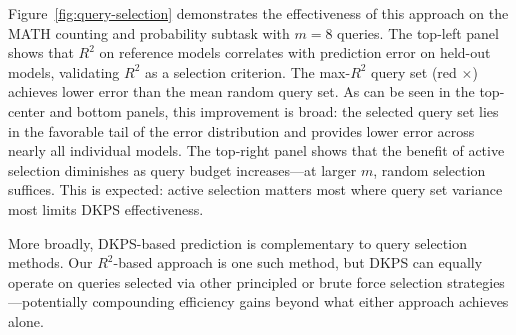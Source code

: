 Figure~\ref{fig:query-selection} demonstrates the effectiveness of this approach on the MATH counting and probability subtask with $m = 8$ queries.
The top-left panel shows that $R^2$ on reference models correlates with prediction error on held-out models, validating $R^2$ as a selection criterion.
The max-$R^2$ query set (red $\times$) achieves lower error than the mean random query set.
As can be seen in the top-center and bottom panels, this improvement is broad: the selected query set lies in the favorable tail of the error distribution and provides lower error across nearly all individual models.
The top-right panel shows that the benefit of active selection diminishes as query budget increases—at larger $m$, random selection suffices.
This is expected: active selection matters most where query set variance most limits DKPS effectiveness.

More broadly, DKPS-based prediction is complementary to query selection methods.
Our $R^2$-based approach is one such method, but DKPS can equally operate on queries selected via other principled or brute force selection strategies—potentially compounding efficiency gains beyond what either approach achieves alone.


